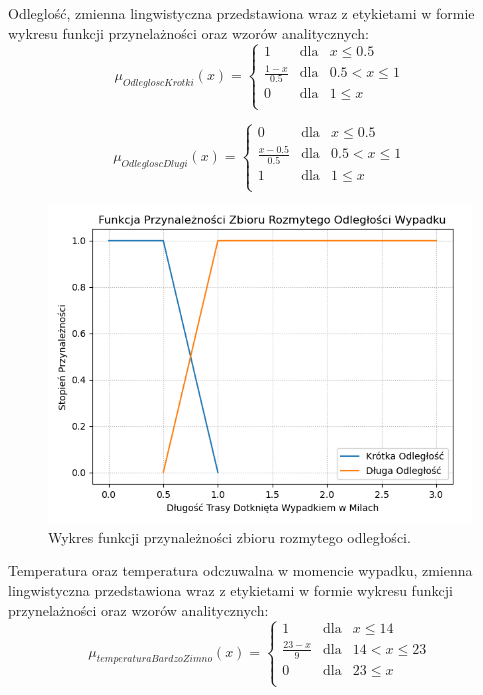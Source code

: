 \documentclass{classrep}
\begin{document}
Odleglość, zmienna lingwistyczna przedstawiona wraz z etykietami w formie wykresu funkcji przynelażności oraz wzorów analitycznych:
\begin{equation}
\mu _{OdlegloscKrotki}(x) =  \left\{ \begin{array}{rcl}
 1 & \mbox{dla} & x  \leq 0.5 \\
\frac{1 - x}{0.5} & \mbox{dla} & 0.5 < x \leq 1\\
0 & \mbox{dla} & 1 \leq x\\
\end{array}\right.
\end{equation}

\begin{equation}
\mu _{OdlegloscDlugi}(x) =  \left\{ \begin{array}{rcl}
 0 & \mbox{dla} & x \leq 0.5 \\
\frac{x - 0.5}{0.5} & \mbox{dla} & 0.5 < x \leq 1\\
1 & \mbox{dla} & 1 \leq x\\
\end{array}\right.
\end{equation}

\begin{figure}[h!]
 \centering
 \includegraphics[width=14cm]{FunkcjaPrzynaleznosciOdleglosc.png}
 \vspace{-0.3cm}
 \caption{Wykres funkcji przynależności zbioru rozmytego odległości. }
 \label{rysunek do eksperymentu 1 wariantu 1}
\end{figure}
\newpage

Temperatura oraz temperatura odczuwalna w momencie wypadku, zmienna lingwistyczna przedstawiona wraz z etykietami w formie wykresu funkcji przynelażności oraz wzorów analitycznych:
\begin{equation}
\mu _{temperaturaBardzoZimno}(x) =  \left\{ \begin{array}{rcl}
 1 & \mbox{dla} & x  \leq 14 \\
\frac{23 - x}{9} & \mbox{dla} & 14 < x \leq 23\\
0 & \mbox{dla} & 23 \leq x\\
\end{array}\right.
\end{equation}
\end{document}
